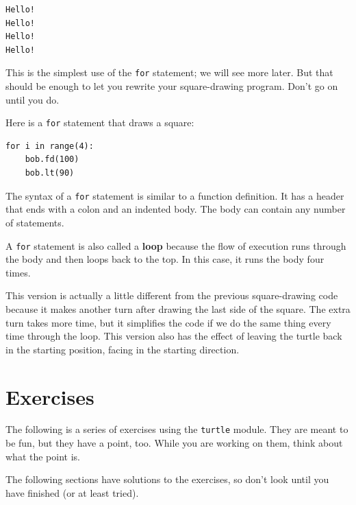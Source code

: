\documentclass[10pt]{book}
\begin{document}
\begin{verbatim}
Hello!
Hello!
Hello!
Hello!
\end{verbatim}
%
This is the simplest use of the {\tt for} statement; we will see
more later.  But that should be enough to let you rewrite your
square-drawing program.  Don't go on until you do.

Here is a {\tt for} statement that draws a square:

\begin{verbatim}
for i in range(4):
    bob.fd(100)
    bob.lt(90)
\end{verbatim}
%
The syntax of a {\tt for} statement is similar to a function
definition.  It has a header that ends with a colon and an indented
body.  The body can contain any number of statements.

A {\tt for} statement is also called a {\bf loop} because
the flow of execution runs through the body and then loops back
to the top.  In this case, it runs the body four times.

This version is actually a little different from the previous
square-drawing code because it makes another turn after
drawing the last side of the square.  The extra turn takes
more time, but it simplifies the code if we do the same thing
every time through the loop.  This version also has the effect
of leaving the turtle back in the starting position, facing in
the starting direction.

\section{Exercises}

The following is a series of exercises using the {\tt turtle} module.  They
are meant to be fun, but they have a point, too.  While you are
working on them, think about what the point is.

The following sections have solutions to the exercises, so
don't look until you have finished (or at least tried).
\end{document}
